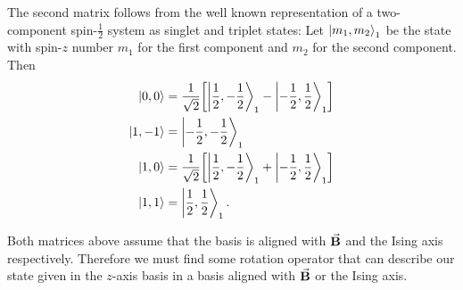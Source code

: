 \documentclass[a4paper]{article}
\begin{document}
The second matrix follows from the well known representation of a two-component
spin-\(\frac{1}{2}\) system as singlet and triplet states: Let \(\ket{m_1, m_2}_1\) be the
state with spin-\(z\) number \(m_1\) for the first component and \(m_2\) for the second
component. Then
\begin{align*}
    \ket{0, 0} &= \frac{1}{\sqrt{2}}\bqty{\ket{\frac{1}{2}, -\frac{1}{2}}_1 -
                \ket{-\frac{1}{2}, \frac{1}{2}}_1}\\
    \ket{1, -1} &= \ket{-\frac{1}{2}, -\frac{1}{2}}_1\\
    \ket{1, 0} &= \frac{1}{\sqrt{2} }\bqty{\ket{\frac{1}{2}, -\frac{1}{2}}_1 +
            \ket{-\frac{1}{2}, \frac{1}{2}}_1}\\
    \ket{1, 1} &= \ket{\frac{1}{2}, \frac{1}{2}}_1
.\end{align*}

Both matrices above assume that the basis is aligned with \(\va{B}\) and the Ising axis
respectively. Therefore we must find some rotation operator that can describe our state
given in the \(z\)-axis basis in a basis aligned with \(\va{B}\) or the Ising axis.
\end{document}
